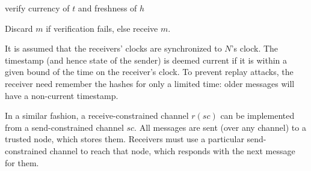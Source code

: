 \documentclass[doc,natbib,12pt]{article}
\begin{document}
	\hspace{0.628in} verify currency of $t$ and freshness of $h$
	
	\hspace{0.628in} Discard $m$ if verification fails, else receive $m$.
	
	It is assumed that the receivers' clocks are synchronized to $N$'s clock. The timestamp (and hence state of the sender) is deemed current if it is within a given bound of the time on the receiver's clock. To prevent replay attacks, the receiver need remember the hashes for only a limited time: older messages will have a non-current timestamp.
	
	In a similar fashion, a receive-constrained channel $r(sc)$ can be implemented from a send-constrained channel $sc$. All messages are sent (over any channel) to a trusted node, which stores them. Receivers must use a particular send-constrained channel to reach that node, which responds with the next message for them.
	
	
\end{document}
